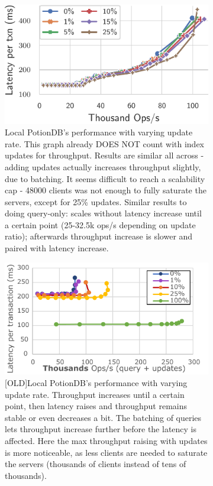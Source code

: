 \documentclass[sigplan,10pt]{acmart}
\begin{document}
\begin{figure}[h]
	\centering
	\begin{subfigure}{.47\linewidth}
		\includegraphics[width=1\linewidth]{singleQuery/upd_rate_local_tc}
		\caption{Local PotionDB's performance with varying update rate. This graph already DOES NOT count with index updates for throughput. Results are similar all across - adding updates actually increases throughput slightly, due to batching. It seems difficult to reach a scalability cap - 48000 clients was not enough to fully saturate the servers, except for 25\% updates. Similar results to doing query-only: scales without latency increase until a certain point (25-32.5k ops/s depending on update ratio); afterwards throughput increase is slower and paired with latency increase.}
		\label{fig:(new)update_rates_local_tc}
	\end{subfigure}%
	\hspace*{3em}
	\begin{subfigure}{.47\linewidth}
		\includegraphics[width=1\linewidth]{updRate_tc_cut}
		\caption{[OLD]Local PotionDB's performance with varying update rate. Throughput increases until a certain point, then latency raises and throughput remains stable or even decreases a bit. The batching of queries lets throughput increase further before the latency is affected. Here the max throughput raising with updates is more noticeable, as less clients are needed to saturate the servers (thousands of clients instead of tens of thousands).}
		\label{fig:(old)update_rates_local_tc}
	\end{subfigure}
	\caption{}
\end{figure}
\end{document}
